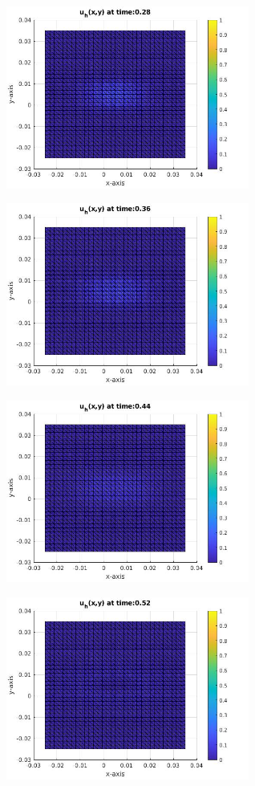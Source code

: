 \documentclass[a4paper,11pt]{article}
\begin{document}
\begin{figure}[h]
\begin{subfigure}{0.4\textwidth}
		\includegraphics[width =8cm]{./tc2-1/028.jpg}
	\end{subfigure}
	\begin{subfigure}{0.4\textwidth}
		\includegraphics[width = 8cm]{./tc2-1/036.jpg}
	\end{subfigure}
	\begin{subfigure}{0.4\textwidth}
		\includegraphics[width =8cm]{./tc2-1/044.jpg}
	\end{subfigure}
	\begin{subfigure}{0.4\textwidth}
		\includegraphics[width = 8cm]{./tc2-1/052.jpg}

\end{subfigure}
\end{figure}
\end{document}
